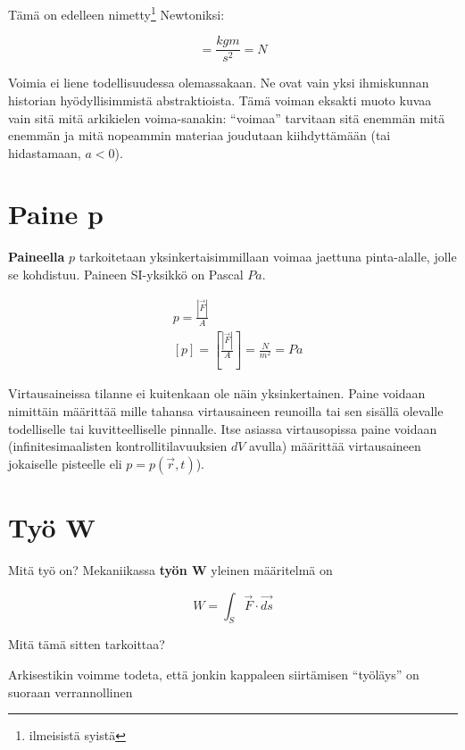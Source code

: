 \documentclass[12pt,a4paper,finnish]{book}
\begin{document}
Tämä on edelleen nimetty\footnote{ilmeisistä syistä} Newtoniksi:

\begin{equation}
 [F] = \frac{kgm}{s^2} = N
\end{equation}

Voimia ei liene todellisuudessa olemassakaan. Ne ovat vain yksi ihmiskunnan historian hyödyllisimmistä abstraktioista. 
Tämä voiman eksakti muoto kuvaa vain sitä mitä arkikielen voima-sanakin: ``voimaa'' tarvitaan sitä enemmän mitä enemmän 
ja mitä nopeammin materiaa joudutaan kiihdyttämään (tai hidastamaan, $ a < 0$).

\section{Paine p} %

\textbf{Paineella} $p$ tarkoitetaan yksinkertaisimmillaan voimaa jaettuna pinta-alalle, jolle se kohdistuu.
Paineen SI-yksikkö on Pascal $Pa$.

\begin{align}
 &p = \frac{|\vec{F}|}{A}\\
 &[p] = \left[\frac{|\vec{F}|}{A}\right] = \frac{N}{m^2} = Pa
\end{align}

Virtausaineissa tilanne ei kuitenkaan ole näin yksinkertainen. Paine voidaan nimittäin määrittää 
mille tahansa virtausaineen reunoilla tai sen sisällä olevalle todelliselle tai kuvitteelliselle pinnalle. 
Itse asiassa virtausopissa paine voidaan (infinitesimaalisten kontrollitilavuuksien $dV$ avulla) määrittää
virtausaineen jokaiselle pisteelle eli $p = p(\vec{r}, t)$).

\section{Työ W} \label{def:W}%

Mitä työ on? Mekaniikassa \textbf{työn W} yleinen määritelmä on

\begin{equation}
\label{eq:W}
 W = \int_S \vec{F} \cdot \vec{ds}
\end{equation}

Mitä tämä sitten tarkoittaa? 

Arkisestikin voimme todeta, että jonkin kappaleen siirtämisen ``työläys'' on suoraan verrannollinen
\end{document}
